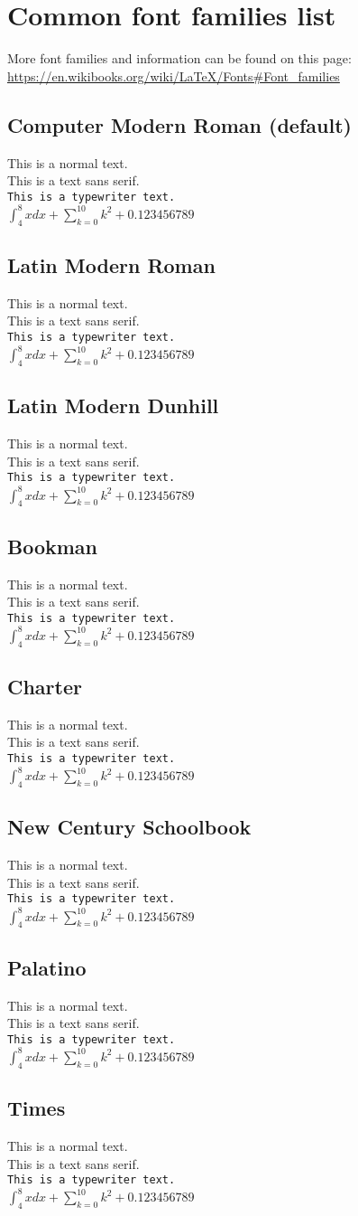\documentclass[twocolumn]{article}
\newcommand{\sample}{This is a normal text. \\ \textsf{This is a text sans serif.} \\ \texttt{This is a typewriter text.} \\ $\int_{4}^{8}xdx + \sum_{k=0}^{10} k^{2}+0.123456789 $}
\begin{document}
\section*{Common font families list}

More font families and information can be found on this page: \url{https://en.wikibooks.org/wiki/LaTeX/Fonts#Font_families}

\subsection*{Computer Modern Roman (default)}

\selectfont
\sample

\subsection*{Latin Modern Roman}

\selectfont
\sample

\subsection*{Latin Modern Dunhill}

\selectfont
\sample

\subsection*{Bookman}

\selectfont
\sample

\subsection*{Charter}

\selectfont
\sample

\subsection*{New Century Schoolbook}

\selectfont
\sample

\subsection*{Palatino}

\selectfont
\sample

\subsection*{Times}

\selectfont
\sample
\end{document}

